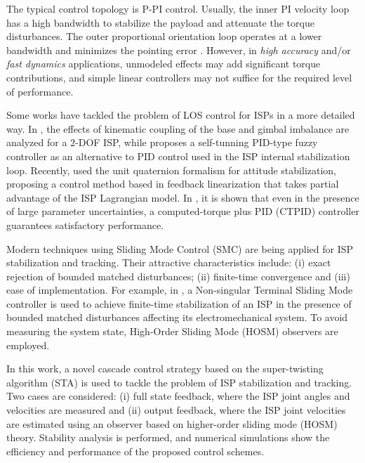 The typical control topology is P-PI control. Usually, the inner PI velocity loop has a high bandwidth to stabilize the payload and attenuate the torque disturbances. The outer proportional orientation loop operates at a lower bandwidth and minimizes the pointing error \cite{Hilkert2008, Masten2008, Kennedy2014}.
%
However, in \textit{high accuracy} and/or \textit{fast dynamics} applications, unmodeled effects may add significant torque contributions, and simple linear controllers may not suffice for the required level of performance.
%

Some works have tackled the problem of LOS control for ISPs in a more detailed way. 
%
%
In \cite{Abdo2013}, the effects of kinematic coupling of the base and gimbal imbalance are analyzed for a $2$-DOF ISP, while \cite{Abdo2014} proposes a self-tunning PID-type fuzzy controller as an alternative to PID control used in the ISP internal stabilization loop.
%
%
Recently, \cite{Konigseder2017} used the unit quaternion formalism for attitude stabilization, proposing a control method based in feedback linearization that takes partial advantage of the ISP Lagrangian model.
%
In \cite{Reis2018}, it is shown that even in the presence of large parameter uncertainties, a computed-torque plus PID (CTPID) controller guarantees satisfactory performance.

Modern techniques using Sliding Mode Control (SMC) are being applied for ISP stabilization and tracking.
%
Their attractive characteristics include: (i) exact rejection of bounded matched disturbances; (ii) finite-time convergence and (iii) ease of implementation.
%
For example, in \cite{Mao2017}, a Non-singular Terminal Sliding Mode controller \cite{Feng2002} is used to achieve finite-time stabilization of an ISP in the presence of bounded matched disturbances affecting its electromechanical system.
%
To avoid measuring the system state, High-Order Sliding Mode (HOSM) observers are employed.
%

In this work, a novel cascade control strategy based on the super-twisting algorithm (STA) is used to tackle the problem of ISP stabilization and tracking.
%
Two cases are considered: (i) full state feedback, where the ISP joint angles and velocities are measured and (ii) output feedback, where the ISP joint velocities are estimated using an observer based on higher-order sliding mode (HOSM) theory.
%
Stability analysis is performed, and numerical simulations show the efficiency and performance of the proposed control schemes.
